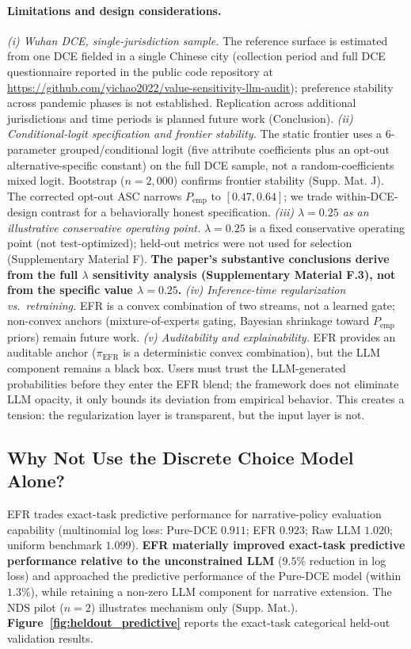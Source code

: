 \documentclass[12pt]{article}
\begin{document}
\paragraph*{Limitations and design considerations.} \emph{(i) Wuhan DCE, single-jurisdiction sample.} The reference surface is estimated from one DCE fielded in a single Chinese city (collection period and full DCE questionnaire reported in the public code repository at \url{https://github.com/yichao2022/value-sensitivity-llm-audit}); preference stability across pandemic phases is not established. Replication across additional jurisdictions and time periods is planned future work (Conclusion). \emph{(ii) Conditional-logit specification and frontier stability.} The static frontier uses a 6-parameter grouped/conditional logit (five attribute coefficients plus an opt-out alternative-specific constant) on the full DCE sample, not a random-coefficients mixed logit. Bootstrap ($n=2{,}000$) confirms frontier stability (Supp. Mat. J). The corrected opt-out ASC narrows $P_{\mathrm{emp}}$ to $[0.47, 0.64]$; we trade within-DCE-design contrast for a behaviorally honest specification. \emph{(iii) \(\lambda = 0.25\) as an illustrative conservative operating point.} $\lambda=0.25$ is a fixed conservative operating point (not test-optimized); held-out metrics were not used for selection (Supplementary Material F). \textbf{The paper's substantive conclusions derive from the full $\lambda$ sensitivity analysis (Supplementary Material F.3), not from the specific value $\lambda = 0.25$.} \emph{(iv) Inference-time regularization vs.\ retraining.} EFR is a convex combination of two streams, not a learned gate; non-convex anchors (mixture-of-experts gating, Bayesian shrinkage toward $P_{\mathrm{emp}}$ priors) remain future work. 
\emph{(v) Auditability and explainability.} EFR provides an auditable anchor ($\pi_{\mathrm{EFR}}$ is a deterministic convex combination), but the LLM component remains a black box. Users must trust the LLM-generated probabilities before they enter the EFR blend; the framework does not eliminate LLM opacity, it only bounds its deviation from empirical behavior. This creates a tension: the regularization layer is transparent, but the input layer is not.

\subsection{Why Not Use the Discrete Choice Model Alone?}
\label{sec:why_not_dce}

EFR trades exact-task predictive performance for narrative-policy evaluation capability (multinomial log loss: Pure-DCE $0.911$; EFR $0.923$; Raw LLM $1.020$; uniform benchmark $1.099$). \textbf{EFR materially improved exact-task predictive performance relative to the unconstrained LLM} ($9.5\%$ reduction in log loss) and approached the predictive performance of the Pure-DCE model (within $1.3\%$), while retaining a non-zero LLM component for narrative extension. The NDS pilot ($n=2$) illustrates mechanism only (Supp. Mat.). \textbf{Figure~\ref{fig:heldout_predictive}} reports the exact-task categorical held-out validation results.
\end{document}
